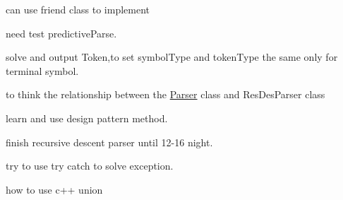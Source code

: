 
\begin{DoxyRefList}
\item[\label{todo__todo000004}%
\hypertarget{todo__todo000004}{}%
Class \hyperlink{class_parser}{Parser} ]can use friend class to implement  
\item[\label{todo__todo000002}%
\hypertarget{todo__todo000002}{}%
Member \hyperlink{class_parser_a69a4eff828356f0c9cbf94f904ef596f}{Parser\+:\+:predictive\+Parse} ()]need test predictive\+Parse. 

solve and output Token,to set symbol\+Type and token\+Type the same only for terminal symbol.  
\item[\label{todo__todo000005}%
\hypertarget{todo__todo000005}{}%
Member \hyperlink{class_parser_a2b52de0ab06881c5f9906812aaaca3cb}{Parser\+:\+:Rec\+Des\+Parser} ]to think the relationship between the \hyperlink{class_parser}{Parser} class and Res\+Des\+Parser class 

learn and use design pattern method.  
\item[\label{todo__todo000006}%
\hypertarget{todo__todo000006}{}%
Class \hyperlink{class_rec_des_parser}{Rec\+Des\+Parser} ]finish recursive descent parser until 12-\/16 night.  
\item[\label{todo__todo000007}%
\hypertarget{todo__todo000007}{}%
Member \hyperlink{class_scanner_a377ef4e058992b4083bd835f30e113aa}{Scanner\+:\+:clean\+Up} ()]try to use try catch to solve exception.  
\item[\label{todo__todo000001}%
\hypertarget{todo__todo000001}{}%
Member \hyperlink{class_tree_node_a62f65fbb26a3d18a773f8e7f201303b3}{Tree\+Node\+:\+:Node\+Type} ]how to use c++ union 
\end{DoxyRefList}